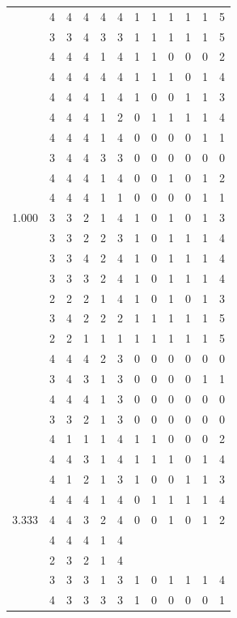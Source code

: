 \documentclass[]{msu-thesis}
\theoremstyle{definition}
\theoremstyle{definition}
\theoremstyle{definition}
\theoremstyle{remark}
\begin{document}
\begin{table}
{\begin{tabular}[t]{rrrrrrrrrrrr}
 & 4 & 4 & 4 & 4 & 4 & 1 & 1 & 1 & 1 & 1 & 5\\
 & 3 & 3 & 4 & 3 & 3 & 1 & 1 & 1 & 1 & 1 & 5\\
 & 4 & 4 & 4 & 1 & 4 & 1 & 1 & 0 & 0 & 0 & 2\\
 & 4 & 4 & 4 & 4 & 4 & 1 & 1 & 1 & 0 & 1 & 4\\
 & 4 & 4 & 4 & 1 & 4 & 1 & 0 & 0 & 1 & 1 & 3\\
 & 4 & 4 & 4 & 1 & 2 & 0 & 1 & 1 & 1 & 1 & 4\\
 & 4 & 4 & 4 & 1 & 4 & 0 & 0 & 0 & 0 & 1 & 1\\
 & 3 & 4 & 4 & 3 & 3 & 0 & 0 & 0 & 0 & 0 & 0\\
 & 4 & 4 & 4 & 1 & 4 & 0 & 0 & 1 & 0 & 1 & 2\\
 & 4 & 4 & 4 & 1 & 1 & 0 & 0 & 0 & 0 & 1 & 1\\
1.000 & 3 & 3 & 2 & 1 & 4 & 1 & 0 & 1 & 0 & 1 & 3\\
 & 3 & 3 & 2 & 2 & 3 & 1 & 0 & 1 & 1 & 1 & 4\\
 & 3 & 3 & 4 & 2 & 4 & 1 & 0 & 1 & 1 & 1 & 4\\
 & 3 & 3 & 3 & 2 & 4 & 1 & 0 & 1 & 1 & 1 & 4\\
 & 2 & 2 & 2 & 1 & 4 & 1 & 0 & 1 & 0 & 1 & 3\\
 & 3 & 4 & 2 & 2 & 2 & 1 & 1 & 1 & 1 & 1 & 5\\
 & 2 & 2 & 1 & 1 & 1 & 1 & 1 & 1 & 1 & 1 & 5\\
 & 4 & 4 & 4 & 2 & 3 & 0 & 0 & 0 & 0 & 0 & 0\\
 & 3 & 4 & 3 & 1 & 3 & 0 & 0 & 0 & 0 & 1 & 1\\
 & 4 & 4 & 4 & 1 & 3 & 0 & 0 & 0 & 0 & 0 & 0\\
 & 3 & 3 & 2 & 1 & 3 & 0 & 0 & 0 & 0 & 0 & 0\\
 & 4 & 1 & 1 & 1 & 4 & 1 & 1 & 0 & 0 & 0 & 2\\
 & 4 & 4 & 3 & 1 & 4 & 1 & 1 & 1 & 0 & 1 & 4\\
 & 4 & 1 & 2 & 1 & 3 & 1 & 0 & 0 & 1 & 1 & 3\\
 & 4 & 4 & 4 & 1 & 4 & 0 & 1 & 1 & 1 & 1 & 4\\
3.333 & 4 & 4 & 3 & 2 & 4 & 0 & 0 & 1 & 0 & 1 & 2\\
 & 4 & 4 & 4 & 1 & 4 &  &  &  &  &  & \\
 & 2 & 3 & 2 & 1 & 4 &  &  &  &  &  & \\
 & 3 & 3 & 3 & 1 & 3 & 1 & 0 & 1 & 1 & 1 & 4\\
 & 4 & 3 & 3 & 3 & 3 & 1 & 0 & 0 & 0 & 0 & 1\\

\end{tabular}}
\end{table}
\end{document}
